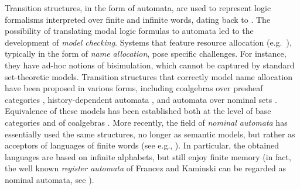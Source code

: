 Transition structures, in the form of automata, are used to represent logic formalisms interpreted over finite and infinite words, dating back to \cite{Buchi60,Elgot61}. The possibility of translating modal logic formulas to automata led to the development of \emph{model checking}. 
%
Systems that feature resource allocation (e.g.\ \cite{MilnerPW92}), typically in the form of \emph{name allocation}, %
pose specific challenges. For instance, they have ad-hoc notions of bisimulation, which cannot be captured by standard set-theoretic models.
Transition structures that correctly model name allocation have been proposed in various forms, including coalgebras over presheaf categories \cite{FioreT01,BonchiBCG11,Miculan08,GhaniYV04,SammartinoM14}, history-dependent automata \cite{MontanariP05}, and automata over nominal sets \cite{BojanczykKL11}. Equivalence of these models has been established both at the level of base categories \cite{GadducciMM06,FioreS06,CianciaKM10} and of coalgebras \cite{CianciaM10}. More recently, the field of \emph{nominal automata} has essentially used the same structures, no longer as semantic models, but rather as acceptors of languages of finite words (see e.g., \cite{Tze11,KST12,GC11,BojanczykKL11}). In particular, the obtained languages are based on infinite alphabets, but still enjoy finite memory (in fact, the well known \emph{register automata} of Francez and Kaminski can be regarded as nominal automata, see \cite{BojanczykKL11}). 


